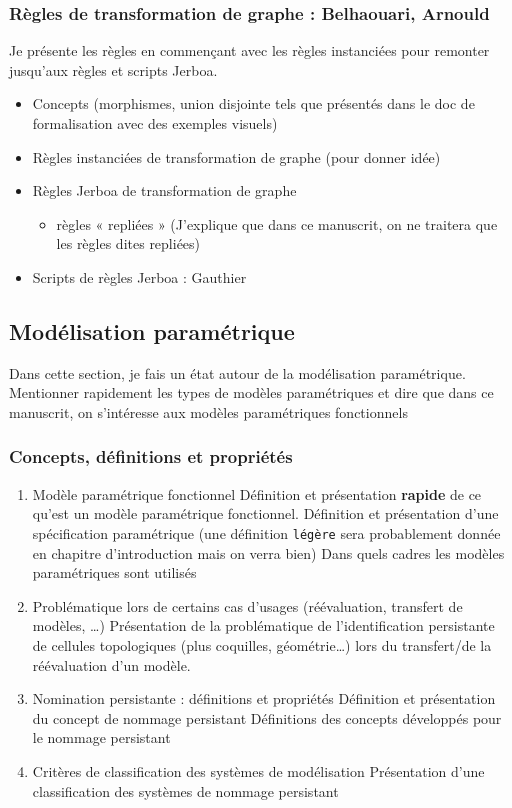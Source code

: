 \documentclass[11pt]{article}
\begin{document}
\subsubsection{Règles de transformation de graphe : Belhaouari, Arnould}
\label{sec:org7b65932}
Je présente les règles en commençant avec les règles instanciées pour remonter jusqu'aux règles et scripts Jerboa.
\begin{itemize}
\item Concepts (morphismes, union disjointe tels que présentés dans le doc de formalisation avec des exemples visuels)
\item Règles instanciées de transformation de graphe (pour donner idée)
\item Règles Jerboa de transformation de graphe
\begin{itemize}
\item règles « repliées » (J'explique que dans ce manuscrit, on ne traitera que les règles dites repliées)
\end{itemize}
\item Scripts de règles Jerboa : Gauthier
\end{itemize}
\subsection{Modélisation paramétrique}
\label{sec:orgc8ddf6e}
Dans cette section, je fais un état autour de la modélisation paramétrique.
Mentionner rapidement les types de modèles paramétriques et dire que dans ce manuscrit, on s'intéresse aux modèles paramétriques fonctionnels
\subsubsection{Concepts, définitions et propriétés}
\label{sec:orgbf59b10}
\begin{enumerate}
\item Modèle paramétrique fonctionnel
\label{sec:org64f3f8b}
Définition et présentation \textbf{rapide} de ce qu'est un modèle paramétrique fonctionnel.
Définition et présentation d'une spécification paramétrique (une définition \texttt{légère} sera probablement donnée en chapitre d'introduction mais on verra bien)
Dans quels cadres les modèles paramétriques sont utilisés
\item Problématique lors de certains cas d'usages (réévaluation, transfert de modèles, …)
\label{sec:org1f342ef}
Présentation de la problématique de l'identification persistante de cellules topologiques (plus coquilles, géométrie…) lors du transfert/de la réévaluation d'un modèle.
\item Nomination persistante : définitions et propriétés
\label{sec:org48fd45b}
Définition et présentation du concept de nommage persistant
Définitions des concepts développés pour le nommage persistant
\item Critères de classification des systèmes de modélisation
\label{sec:org3bba19d}
Présentation d'une classification des systèmes de nommage persistant
\end{enumerate}
\end{document}
